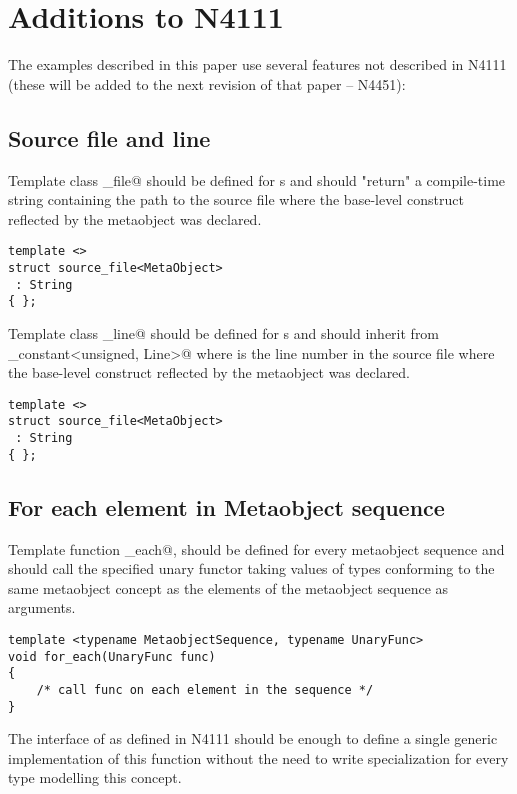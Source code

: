 \section{Additions to N4111}

The examples described in this paper use several features not described in N4111
(these will be added to the next revision of that paper -- N4451):

\subsection{Source file and line}

Template class \verb@source_file@ should be defined for s
and should "return" a compile-time string containing the path to the source file
where the base-level construct reflected by the metaobject was declared.

\begin{verbatim}
template <>
struct source_file<MetaObject>
 : String
{ };
\end{verbatim}

Template class \verb@source_line@ should be defined for s
and should inherit from \verb@integral_constant<unsigned, Line>@ where
\verb@Line@ is the line number in the source file
where the base-level construct reflected by the metaobject was declared.

\begin{verbatim}
template <>
struct source_file<MetaObject>
 : String
{ };
\end{verbatim}

\subsection{For each element in Metaobject sequence}

Template function \verb@for_each@, should be defined for every metaobject sequence
and should call the specified unary functor taking values of types conforming to
the same metaobject concept as the elements of the metaobject sequence as arguments.

\begin{verbatim}
template <typename MetaobjectSequence, typename UnaryFunc>
void for_each(UnaryFunc func)
{
	/* call func on each element in the sequence */
}
\end{verbatim}

The interface of  as defined in N4111 should be enough
to define a single generic implementation of this function without the need
to write specialization for every type modelling this concept.

